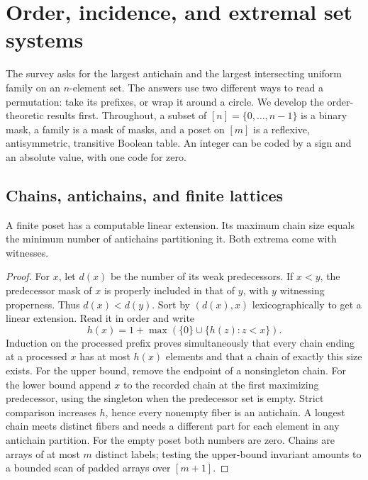 \section{Order, incidence, and extremal set systems}
\label{sec:order-structure}

The survey asks for the largest antichain and the largest intersecting uniform
family on an \(n\)-element set. The answers use two different ways to read
a permutation: take its prefixes, or wrap it around a circle. We develop
the order-theoretic results first. Throughout, a subset of \([n]=\{0,\ldots,n-1\}\)
is a binary mask, a family is a mask of masks, and a poset on \([m]\) is
a reflexive, antisymmetric, transitive Boolean table. An integer can be
coded by a sign and an absolute value, with one code for zero.

\subsection{Chains, antichains, and finite lattices}

\begin{theorem}\label{result35}
A finite poset has a computable linear extension. Its maximum chain size
equals the minimum number of antichains partitioning it. Both extrema
come with witnesses.
\end{theorem}
\begin{proof}
For \(x\), let \(d(x)\) be the number of its weak predecessors. If \(x<y\),
the predecessor mask of \(x\) is properly included in that of \(y\), with
\(y\) witnessing properness. Thus \(d(x)<d(y)\). Sort by \((d(x),x)\)
lexicographically to get a linear extension. Read it in order and write
\[
 h(x)=1+\max(\{0\}\cup\{h(z):z<x\}).
\]
Induction on the processed prefix proves simultaneously that every chain
ending at a processed \(x\) has at most \(h(x)\) elements and that a chain
of exactly this size exists. For the upper bound, remove the endpoint
of a nonsingleton chain. For the lower bound append \(x\) to the recorded
chain at the first maximizing predecessor, using the singleton when the
predecessor set is empty. Strict comparison increases \(h\), hence every
nonempty fiber is an antichain. A longest chain meets distinct fibers
and needs a different part for each element in any antichain partition.
For the empty poset both numbers are zero. Chains are arrays of at most
\(m\) distinct labels; testing the upper-bound invariant amounts to a
bounded scan of padded arrays over \([m+1]\).
\end{proof}

